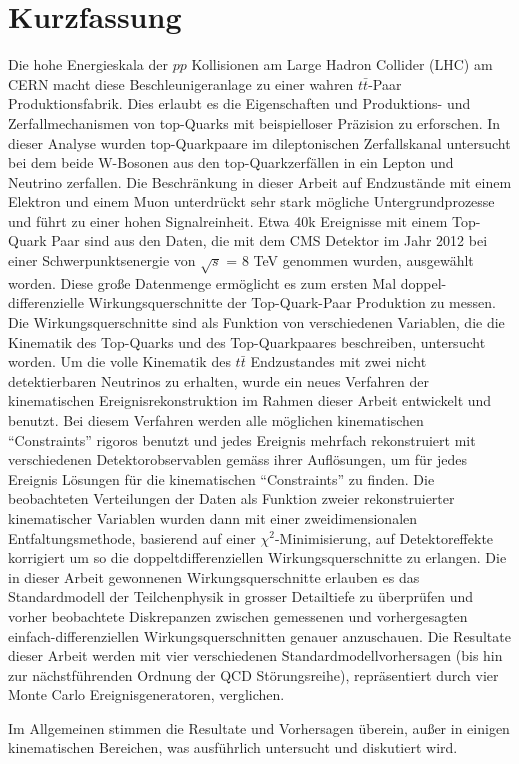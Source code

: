 \thispagestyle{empty}
\vspace{-3cm}
\section*{\centering Kurzfassung}

\vspace{\baselineskip}

Die hohe Energieskala der $pp$ Kollisionen am Large Hadron Collider (LHC) am CERN macht
diese Beschleunigeranlage zu einer wahren $t\bar{t}$-Paar Produktionsfabrik. 
%
Dies erlaubt es die Eigenschaften und
Produktions- und Zerfallmechanismen von top-Quarks mit beispielloser Pr{\"a}zision zu erforschen.
%
In dieser Analyse wurden top-Quarkpaare im dileptonischen 
Zerfallskanal untersucht bei dem beide W-Bosonen aus den top-Quarkzerf\"allen
in ein Lepton und Neutrino zerfallen.
%
Die Beschr\"ankung in dieser Arbeit auf Endzust\"ande mit einem Elektron und einem Muon
unterdr\"uckt sehr stark m\"ogliche Untergrundprozesse und f\"uhrt zu einer hohen Signalreinheit.
%
Etwa 40k Ereignisse mit einem Top-Quark Paar sind aus den
Daten, die mit dem CMS Detektor im Jahr 2012 bei einer Schwerpunktsenergie
von  $\sqrt{s}$ = 8 TeV genommen wurden, ausgew{\"a}hlt worden. 
%
Diese gro{\ss}e Datenmenge erm\"oglicht es zum ersten Mal 
doppel-differenzielle Wirkungsquerschnitte der Top-Quark-Paar Produktion
zu messen.
%
Die Wirkungsquerschnitte sind als Funktion von verschiedenen Variablen, die die Kinematik des
Top-Quarks und des Top-Quarkpaares beschreiben, untersucht worden.
%
Um die volle Kinematik des $t\bar{t}$ Endzustandes mit zwei nicht detektierbaren Neutrinos 
zu erhalten, wurde ein neues Verfahren der kinematischen Ereignisrekonstruktion im Rahmen dieser Arbeit entwickelt und benutzt. 
%
Bei diesem Verfahren werden alle m{\"o}glichen kinematischen ``Constraints'' rigoros benutzt und jedes Ereignis mehrfach
rekonstruiert mit verschiedenen Detektorobservablen gem{\"a}ss ihrer Aufl{\"o}sungen, um f{\"u}r 
jedes Ereignis L{\"o}sungen f{\"u}r die kinematischen ``Constraints'' zu finden.
%
Die beobachteten Verteilungen der Daten als Funktion zweier rekonstruierter kinematischer
Variablen wurden dann mit einer zweidimensionalen Entfaltungsmethode, basierend
auf einer $\chi^2$-Minimisierung,  auf Detektoreffekte
korrigiert um so die doppeltdifferenziellen Wirkungsquerschnitte zu erlangen.
%
Die in dieser Arbeit gewonnenen Wirkungsquerschnitte erlauben 
es das  Standardmodell der Teilchenphysik in grosser Detailtiefe 
zu {\"u}berpr{\"u}fen und vorher beobachtete Diskrepanzen zwischen gemessenen und vorhergesagten 
einfach-differenziellen Wirkungsquerschnitten genauer anzuschauen. 
%
Die Resultate dieser Arbeit werden mit vier verschiedenen 
Standardmodellvorhersagen (bis hin zur n\"achstf\"uhrenden Ordnung der QCD St\"orungsreihe),
repr\"asentiert durch vier Monte Carlo Ereignisgeneratoren, verglichen.

Im Allgemeinen stimmen die Resultate und Vorhersagen {\"u}berein, au{\ss}er in einigen kinematischen
Bereichen, was ausf{\"u}hrlich untersucht und diskutiert wird.

\newpage
\thispagestyle{empty}
\mbox{}